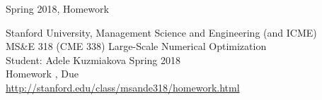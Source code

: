 \usepackage{amsmath,amssymb}
\usepackage{url}

\textheight      9.0in
\textwidth       5.5in
\topmargin      -0.1in
\oddsidemargin   0.5in
\evensidemargin  0.5in
\pagestyle{myheadings}

         {Spring 2018, Homework \HWnumb}



\newcommand{\problem}[4]{\fbox
   {\begin{tabular*}{0.84\textwidth}
    {@{}l@{\extracolsep{\fill}}l@{\extracolsep{6pt}}%
        l@{\extracolsep{\fill}}c@{}}
      #1 & $\minimize{#2}$ & $#3$ & $ $ \\[5pt]
         & $\subject$      & $#4$ & $ $
    \end{tabular*}}}

\newcommand{\AI}      {(A\ -\!\!I\,)}
\newcommand{\BS}      {\pmat{B & S}}
\newcommand{\BN}      {\pmat{B & N}}
\newcommand{\codes}[1]{$ $\\ \hbox to 0.4\textwidth{#1\hss}}
\newcommand{\Eq}      {&\!=\!&}
\newcommand{\factol}  {\hbox{\tt FacTol}}
\newcommand{\NL}      {_{\scriptscriptstyle N\!L}}
\newcommand{\phibar}  {{\bar\phi}}
\newcommand{\Tab}     {\\ \hspace*{\parindent}}
\newcommand{\To}      {\,{:}\,}  %
\newcommand{\updatetol}{\hbox{\tt UpdateTol}}
\newcommand{\myvec}[2]{{\displaystyle \pmat{#1\\#2}}}
\newcommand{\xs}      {\myvec xs}
\newcommand{\z}       {\phantom 0}



\thispagestyle{plain}
\begin{center}
           $ $
\\[-0.7in] {\large Stanford University,
                   Management Science and Engineering (and ICME)}
\\[4pt]    {\Large MS\&E 318 (CME 338) \quad  Large-Scale Numerical Optimization}
\\[6pt]    {\large Student: Adele Kuzmiakova \qquad Spring 2018}
\\[7pt]    {\large Homework \HWnumb, Due \HWdate}
\\         {       \url{http://stanford.edu/class/msande318/homework.html}}
\end{center}

